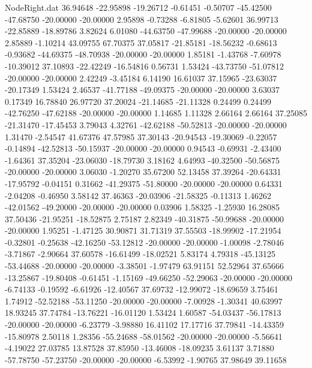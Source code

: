 \begin{filecontents}{NodeRight.dat}
  36.94648  -22.95898  -19.26712    -0.61451   -0.50707  -45.42500  -47.68750  -20.00000  -20.00000    2.95898   -0.73288   -6.81805   -5.62601
  36.99713  -22.85889  -18.89786     3.82624    6.01080  -44.63750  -47.99688  -20.00000  -20.00000    2.85889   -1.10214   43.09755   67.70375
  37.05817  -21.85181  -18.56232    -0.68613   -0.93682  -44.69375  -48.70938  -20.00000  -20.00000    1.85181   -1.43768   -7.60978  -10.39012
  37.10893  -22.42249  -16.54816     0.56731    1.53424  -43.73750  -51.07812  -20.00000  -20.00000    2.42249   -3.45184    6.14190   16.61037
  37.15965  -23.63037  -20.17349     1.53424    2.46537  -41.77188  -49.09375  -20.00000  -20.00000    3.63037    0.17349   16.78840   26.97720
  37.20024  -21.14685  -21.11328     0.24499    0.24499  -42.76250  -47.62188  -20.00000  -20.00000    1.14685    1.11328    2.66164    2.66164
  37.25085  -21.31470  -17.45453     3.79043    4.32761  -42.62188  -50.52813  -20.00000  -20.00000    1.31470   -2.54547   41.67376   47.57985
  37.30143  -20.94543  -19.30069    -0.22057   -0.14894  -42.52813  -50.15937  -20.00000  -20.00000    0.94543   -0.69931   -2.43400   -1.64361
  37.35204  -23.06030  -18.79730     3.18162    4.64993  -40.32500  -50.56875  -20.00000  -20.00000    3.06030   -1.20270   35.67200   52.13458
  37.39264  -20.64331  -17.95792    -0.04151    0.31662  -41.29375  -51.80000  -20.00000  -20.00000    0.64331   -2.04208   -0.46950    3.58142
  37.46363  -20.03906  -21.58325    -0.11313    1.46262  -42.01562  -49.20000  -20.00000  -20.00000    0.03906    1.58325   -1.25930   16.28085
  37.50436  -21.95251  -18.52875     2.75187    2.82349  -40.31875  -50.99688  -20.00000  -20.00000    1.95251   -1.47125   30.90871   31.71319
  37.55503  -18.99902  -17.21954    -0.32801   -0.25638  -42.16250  -53.12812  -20.00000  -20.00000   -1.00098   -2.78046   -3.71867   -2.90664
  37.60578  -16.61499  -18.02521     5.83174    4.79318  -45.13125  -53.44688  -20.00000  -20.00000   -3.38501   -1.97479   63.91151   52.52964
  37.65666  -13.25867  -19.80408    -0.61451   -1.15169  -49.66250  -52.29063  -20.00000  -20.00000   -6.74133   -0.19592   -6.61926  -12.40567
  37.69732  -12.99072  -18.69659     3.75461    1.74912  -52.52188  -53.11250  -20.00000  -20.00000   -7.00928   -1.30341   40.63997   18.93245
  37.74784  -13.76221  -16.01120     1.53424    1.60587  -54.03437  -56.17813  -20.00000  -20.00000   -6.23779   -3.98880   16.41102   17.17716
  37.79841  -14.43359  -15.80978     2.50118    1.28356  -55.24688  -58.01562  -20.00000  -20.00000   -5.56641   -4.19022   27.03785   13.87528
  37.85950  -13.46008  -18.09235     3.61137    3.71880  -57.78750  -57.23750  -20.00000  -20.00000   -6.53992   -1.90765   37.98649   39.11658

\end{filecontents}
